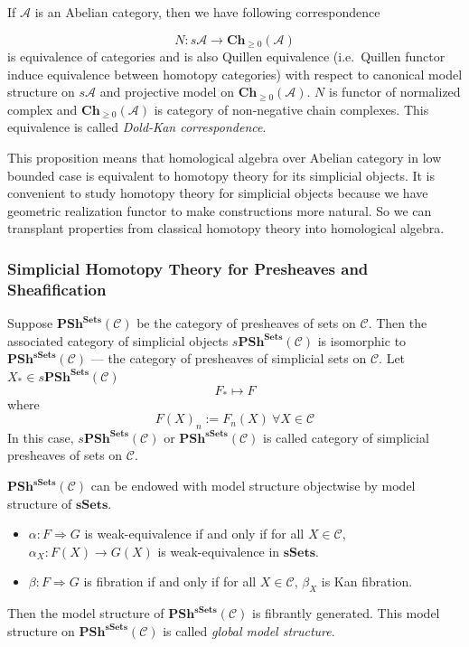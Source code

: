 \documentclass[b5paper,10pt]{article}
\begin{document}
If $\mathcal{A}$ is  an Abelian category, then we have following correspondence
\begin{secprop}
\[
N \colon s\mathcal{A} \to \mathbf{Ch}_{\geq 0} (\mathcal{A})
\]
is equivalence of categories and is also Quillen equivalence (i.e.\ Quillen functor induce equivalence between homotopy categories) with respect to canonical model structure on $s\mathcal{A}$ and projective model on $\mathbf{Ch}_{\geq 0 } (\mathcal{A})$. $N$ is functor of normalized complex and $\mathbf{Ch}_{\geq 0}(\mathcal{A})$ is category of non-negative chain complexes. This equivalence is called \emph{Dold-Kan correspondence}.
\end{secprop}
This proposition means that homological algebra over Abelian category in low bounded case is equivalent to homotopy theory for its simplicial objects. It is convenient to study homotopy theory for simplicial objects because we have geometric realization functor to make constructions more natural. So we can transplant properties from classical homotopy theory into homological algebra.
\subsubsection{Simplicial Homotopy Theory for Presheaves and Sheafification}
Suppose $\mathbf{PSh}^{\mathbf{Sets}}(\mathcal{C})$ be the category of presheaves of sets on $\mathcal{C}$. Then the associated category of simplicial objects $s\mathbf{PSh^{Sets}}(\mathcal{C})$ is isomorphic to $\mathbf{PSh^{sSets}}(\mathcal{C})$ --- the category of presheaves of simplicial sets on $\mathcal{C}$. Let $X_* \in s\mathbf{PSh^{Sets}}(\mathcal{C})$
\[
F_* \mapsto F
\]
where \[
F(X)_n := F_n(X) \ \forall X \in \mathcal{C}
\]
In this case, $s\mathbf{PSh^{Sets}}(\mathcal{C})$ or $\mathbf{PSh^{sSets}}(\mathcal{C})$ is called category of simplicial presheaves of sets on $\mathcal{C}$.

$\mathbf{PSh^{sSets}}(\mathcal{C})$ can be endowed with model structure objectwise by model structure of $\mathbf{sSets}$.
\begin{itemize}
	\item $\alpha \colon F \Rightarrow G$ is weak-equivalence if and only if for all $X \in \mathcal{C}$, $\alpha_X: F(X) \to G(X)$ is weak-equivalence in $\mathbf{sSets}$.
	\item $\beta\colon F \Rightarrow G$ is fibration if and only if for all $X \in \mathcal{C}$, $\beta_X$ is Kan fibration.
\end{itemize}
Then the model structure of $\mathbf{PSh^{sSets}}(\mathcal{C})$ is fibrantly generated. This model structure on $\mathbf{PSh^{sSets}}(\mathcal{C})$ is called \emph{global model structure}.
\end{document}
